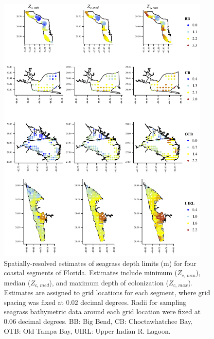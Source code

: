 \documentclass[letterpaper,12pt,oneside]{article}\usepackage[]{graphicx}\usepackage[]{color}
\begin{document}
\begin{figure}
\centering
\includegraphics[width = 0.95\textwidth]{figs/all_ests.pdf}
\caption{Spatially-resolved estimates of seagrass depth limits (m) for four coastal segments of Florida.  Estimates include minimum ($Z_{c,\,min}$), median ($Z_{c,\,med}$), and maximum depth of colonization ($Z_{c,\,max}$).  Estimates are assigned to grid locations for each segment, where grid spacing was fixed at 0.02 decimal degrees.  Radii for sampling seagrass bathymetric data around each grid location were fixed at 0.06 decimal degrees. BB: Big Bend, CB: Choctawhatchee Bay, OTB: Old Tampa Bay, UIRL: Upper Indian R. Lagoon.}
\label{fig:all_ests}
\end{figure}

\end{document}
